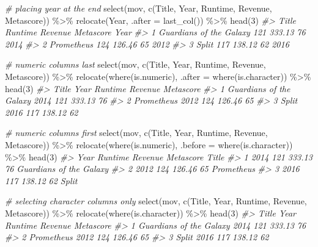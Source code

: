 \documentclass[
]{book}
\newenvironment{Shaded}{\begin{snugshade}}{\end{snugshade}}
\newcommand{\AttributeTok}[1]{\textcolor[rgb]{0.77,0.63,0.00}{#1}}
\newcommand{\CommentTok}[1]{\textcolor[rgb]{0.56,0.35,0.01}{\textit{#1}}}
\newcommand{\DecValTok}[1]{\textcolor[rgb]{0.00,0.00,0.81}{#1}}
\newcommand{\FunctionTok}[1]{\textcolor[rgb]{0.00,0.00,0.00}{#1}}
\newcommand{\NormalTok}[1]{#1}
\newcommand{\SpecialCharTok}[1]{\textcolor[rgb]{0.00,0.00,0.00}{#1}}
\begin{document}
\begin{Shaded}
\begin{Highlighting}[]
\CommentTok{\# placing year at the end}
\FunctionTok{select}\NormalTok{(mov, }\FunctionTok{c}\NormalTok{(Title, Year, Runtime, Revenue, Metascore)) }\SpecialCharTok{\%\textgreater{}\%}
  \FunctionTok{relocate}\NormalTok{(Year, }\AttributeTok{.after =} \FunctionTok{last\_col}\NormalTok{()) }\SpecialCharTok{\%\textgreater{}\%}
  \FunctionTok{head}\NormalTok{(}\DecValTok{3}\NormalTok{)}
\CommentTok{\#\textgreater{}                     Title Runtime Revenue Metascore Year}
\CommentTok{\#\textgreater{} 1 Guardians of the Galaxy     121  333.13        76 2014}
\CommentTok{\#\textgreater{} 2              Prometheus     124  126.46        65 2012}
\CommentTok{\#\textgreater{} 3                   Split     117  138.12        62 2016}

\CommentTok{\# numeric columns last}
\FunctionTok{select}\NormalTok{(mov, }\FunctionTok{c}\NormalTok{(Title, Year, Runtime, Revenue, Metascore)) }\SpecialCharTok{\%\textgreater{}\%}
  \FunctionTok{relocate}\NormalTok{(}\FunctionTok{where}\NormalTok{(is.numeric), }\AttributeTok{.after =} \FunctionTok{where}\NormalTok{(is.character)) }\SpecialCharTok{\%\textgreater{}\%}
  \FunctionTok{head}\NormalTok{(}\DecValTok{3}\NormalTok{)}
\CommentTok{\#\textgreater{}                     Title Year Runtime Revenue Metascore}
\CommentTok{\#\textgreater{} 1 Guardians of the Galaxy 2014     121  333.13        76}
\CommentTok{\#\textgreater{} 2              Prometheus 2012     124  126.46        65}
\CommentTok{\#\textgreater{} 3                   Split 2016     117  138.12        62}

\CommentTok{\# numeric columns first}
\FunctionTok{select}\NormalTok{(mov, }\FunctionTok{c}\NormalTok{(Title, Year, Runtime, Revenue, Metascore)) }\SpecialCharTok{\%\textgreater{}\%}
  \FunctionTok{relocate}\NormalTok{(}\FunctionTok{where}\NormalTok{(is.numeric), }\AttributeTok{.before =} \FunctionTok{where}\NormalTok{(is.character)) }\SpecialCharTok{\%\textgreater{}\%}
  \FunctionTok{head}\NormalTok{(}\DecValTok{3}\NormalTok{)}
\CommentTok{\#\textgreater{}   Year Runtime Revenue Metascore                   Title}
\CommentTok{\#\textgreater{} 1 2014     121  333.13        76 Guardians of the Galaxy}
\CommentTok{\#\textgreater{} 2 2012     124  126.46        65              Prometheus}
\CommentTok{\#\textgreater{} 3 2016     117  138.12        62                   Split}

\CommentTok{\# selecting character columns only}
\FunctionTok{select}\NormalTok{(mov, }\FunctionTok{c}\NormalTok{(Title, Year, Runtime, Revenue, Metascore)) }\SpecialCharTok{\%\textgreater{}\%}
  \FunctionTok{relocate}\NormalTok{(}\FunctionTok{where}\NormalTok{(is.character)) }\SpecialCharTok{\%\textgreater{}\%}
  \FunctionTok{head}\NormalTok{(}\DecValTok{3}\NormalTok{)}
\CommentTok{\#\textgreater{}                     Title Year Runtime Revenue Metascore}
\CommentTok{\#\textgreater{} 1 Guardians of the Galaxy 2014     121  333.13        76}
\CommentTok{\#\textgreater{} 2              Prometheus 2012     124  126.46        65}
\CommentTok{\#\textgreater{} 3                   Split 2016     117  138.12        62}
\end{Highlighting}
\end{Shaded}
\end{document}
